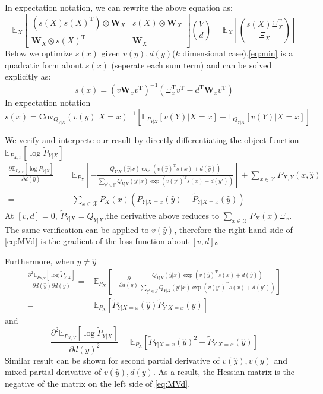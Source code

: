 \documentclass{article}
\def\T{\mathrm{T}}
\def\Cov{\mathrm{Cov}}
\def\E{\mathbb{E}}
\begin{document}
In expectation notation, we can rewrite the above equation as:
\begin{equation}
\E_X\begin{bmatrix}
(s(X)s(X)^\T)\otimes \bm{W}_X & s(X)\otimes \bm{W}_X \\
\bm{W}_X\otimes s(X)^\T & \bm{W}_X
\end{bmatrix}\binom{V}{d}=\E_X\left[\binom{s(X)\Xi_X^\T}{\Xi_X}\right]
\end{equation}
Below we optimize $s(x)$ given $v(y),d(y)$($k$ dimensional case),\eqref{eq:min} is a quadratic form about $s(x)$ (seperate each sum term) and can be solved
explicitly as:
\begin{equation}
s(x)=(v\bm{W}_xv^\T)^{-1}(\Xi_x^\T v^\T -d^\T \bm{W}_x v^\T)
\end{equation}
In expectation notation
\begin{equation}
s(x)=\Cov_{Q_{Y|X}}(v(y)|X=x)^{-1} [\E_{P_{Y|X}}[v(Y)|X=x]-\E_{Q_{Y|X}}[v(Y)|X=x]]
\end{equation}

We verify and interprete our result by directly differentiating the object function $\E_{P_{X,Y}}[\log \tilde{P}_{Y|X}]$
\begin{align*}
\frac{\partial \E_{P_{X,Y}}[\log \tilde{P}_{Y|X}]}{\partial d(\hat{y})} = & \E_{P_X}[-\frac{Q_{Y|X}(\hat{y}|x)\exp(v(\hat{y})^\T s(x)+d(\hat{y}))}{
\sum_{y'\in \mathcal{Y}}Q_{Y|X}(y'|x)\exp(v(y')^\T s(x)+d(y'))}]+\sum_{x\in \mathcal{X}} P_{X,Y}(x,\hat{y})\\
= & \sum_{x\in \mathcal{X}} P_X(x)(P_{Y|X=x}(\hat{y})-\tilde{P}_{Y|X=x}(\hat{y}))
\end{align*}
At $[v,d]=0$, $\tilde{P}_{Y|X}=Q_{Y|X}$,the derivative above reduces to $\sum_{x\in \mathcal{X}}P_X(x)\Xi_x$. The same verification can be applied to $v(\hat{y})$, therefore the right hand side of \eqref{eq:MVd} is the gradient of the loss function about $[v,d]$。

Furthermore, when $y\neq \hat{y}$
\begin{align*}
\frac{\partial^2 \E_{P_{X,Y}}[\log \tilde{P}_{Y|X}]}{\partial d(\hat{y})\partial d(y)} = & \E_{P_X}[-\frac{\partial}{\partial d(y)}\frac{Q_{Y|X}(\hat{y}|x)\exp(v(\hat{y})^\T s(x)+d(\hat{y}))}{
\sum_{y'\in \mathcal{Y}}Q_{Y|X}(y'|x)\exp(v(y')^\T s(x)+d(y'))}]\\
= & \E_{P_X}[\tilde{P}_{Y|X=x}(\hat{y})\tilde{P}_{Y|X=x}(y)]
\end{align*}
and
$$
\frac{\partial^2 \E_{P_{X,Y}}[\log \tilde{P}_{Y|X}]}{\partial d(\hat{y})^2} =
\E_{P_X}[\tilde{P}_{Y|X=x}(\hat{y})^2-\tilde{P}_{Y|X=x}(\hat{y})]
$$
Similar result can be shown for second partial derivative of $v(\hat{y}),v(y)$ and mixed partial derivative of $v(\hat{y}),d(y)$.
As a result, the Hessian matrix is the negative of the matrix on the left side of \eqref{eq:MVd}.
\end{document}
